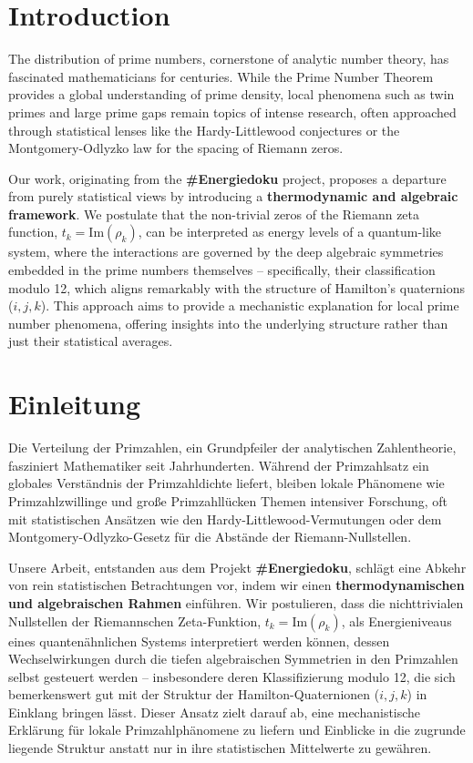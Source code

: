 \documentclass[11pt,twocolumn,a4paper]{article}
\theoremstyle{definition}
\begin{document}
\section{Introduction}
\label{sec:introduction}
The distribution of prime numbers, cornerstone of analytic number theory, has fascinated mathematicians for centuries. While the Prime Number Theorem provides a global understanding of prime density, local phenomena such as twin primes and large prime gaps remain topics of intense research, often approached through statistical lenses like the Hardy-Littlewood conjectures or the Montgomery-Odlyzko law for the spacing of Riemann zeros.

Our work, originating from the \textbf{\#Energiedoku} project, proposes a departure from purely statistical views by introducing a \textbf{thermodynamic and algebraic framework}. We postulate that the non-trivial zeros of the Riemann zeta function, $t_k = \text{Im}(\rho_k)$, can be interpreted as energy levels of a quantum-like system, where the interactions are governed by the deep algebraic symmetries embedded in the prime numbers themselves -- specifically, their classification modulo 12, which aligns remarkably with the structure of Hamilton's quaternions ($i, j, k$). This approach aims to provide a mechanistic explanation for local prime number phenomena, offering insights into the underlying structure rather than just their statistical averages.

\section{Einleitung}
\label{sec:introduction_de}
Die Verteilung der Primzahlen, ein Grundpfeiler der analytischen Zahlentheorie, fasziniert Mathematiker seit Jahrhunderten. Während der Primzahlsatz ein globales Verständnis der Primzahldichte liefert, bleiben lokale Phänomene wie Primzahlzwillinge und große Primzahllücken Themen intensiver Forschung, oft mit statistischen Ansätzen wie den Hardy-Littlewood-Vermutungen oder dem Montgomery-Odlyzko-Gesetz für die Abstände der Riemann-Nullstellen.

Unsere Arbeit, entstanden aus dem Projekt \textbf{\#Energiedoku}, schlägt eine Abkehr von rein statistischen Betrachtungen vor, indem wir einen \textbf{thermodynamischen und algebraischen Rahmen} einführen. Wir postulieren, dass die nichttrivialen Nullstellen der Riemannschen Zeta-Funktion, $t_k = \text{Im}(\rho_k)$, als Energieniveaus eines quantenähnlichen Systems interpretiert werden können, dessen Wechselwirkungen durch die tiefen algebraischen Symmetrien in den Primzahlen selbst gesteuert werden -- insbesondere deren Klassifizierung modulo 12, die sich bemerkenswert gut mit der Struktur der Hamilton-Quaternionen ($i, j, k$) in Einklang bringen lässt. Dieser Ansatz zielt darauf ab, eine mechanistische Erklärung für lokale Primzahlphänomene zu liefern und Einblicke in die zugrunde liegende Struktur anstatt nur in ihre statistischen Mittelwerte zu gewähren.
\end{document}

